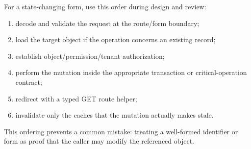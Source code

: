 For a state-changing form, use this order during design and review:

\begin{enumerate}
  \item decode and validate the request at the route/form boundary;
  \item load the target object if the operation concerns an existing record;
  \item establish object/permission/tenant authorization;
  \item perform the mutation inside the appropriate transaction or critical-operation contract;
  \item redirect with a typed GET route helper;
  \item invalidate only the caches that the mutation actually makes stale.
\end{enumerate}

This ordering prevents a common mistake: treating a well-formed identifier or form as proof that the caller may modify the referenced object.
